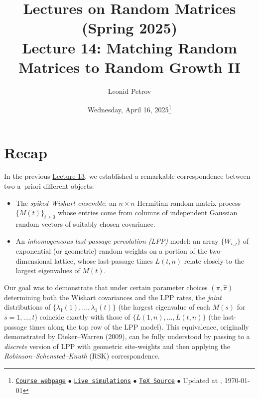 \documentclass[letterpaper,11pt,oneside,reqno]{article}
\numberwithin{equation}{section}
\theoremstyle{definition}
\begin{document}
\title{Lectures on Random Matrices
(Spring 2025)
\\Lecture 14: Matching Random Matrices to Random Growth II}


\date{Wednesday, April 16, 2025\footnote{\href{https://lpetrov.cc/rmt25/}{\texttt{Course webpage}}
$\bullet$ \href{https://lpetrov.cc/simulations/model/random-matrices/}{\texttt{Live simulations}}
$\bullet$ \href{https://lpetrov.cc/rmt25/rmt25-notes/rmt2025-l14.tex}{\texttt{TeX Source}}
$\bullet$
Updated at \currenttime, \today}}



\author{Leonid Petrov}


\maketitle
\tableofcontents



\section{Recap}

In the previous
\href{https://lpetrov.cc/rmt25/rmt25-notes/rmt2025-l13.pdf}{Lecture 13}, we established a remarkable correspondence between two a~priori different objects:

\begin{itemize}
\item The \emph{spiked Wishart ensemble}: an $n\times n$ Hermitian random-matrix process $\{M(t)\}_{t\ge0}$ whose entries come from columns of independent Gaussian random vectors of suitably chosen covariance.
\item An \emph{inhomogeneous last-passage percolation (LPP)} model: an array $\{W_{i,j}\}$ of exponential (or geometric) random weights on a portion of the two-dimensional lattice, whose last-passage times $L(t,n)$ relate closely to the largest eigenvalues of $M(t)$.
\end{itemize}

Our goal was to demonstrate that under certain parameter choices $(\pi,\hat\pi)$ determining both the Wishart covariances and the LPP rates, the \emph{joint} distributions of $\{\lambda_1(1),\dots,\lambda_1(t)\}$ (the largest eigenvalue of each $M(s)$ for $s=1,\dots,t$) coincide exactly with those of $\{L(1,n),\dots,L(t,n)\}$ (the last-passage times along the top row of the LPP model). This equivalence, originally demonstrated by Dieker--Warren (2009), can be fully understood by passing to a \emph{discrete} version of LPP with geometric site-weights and then applying the \emph{Robinson--Schensted--Knuth} (RSK) correspondence.
\end{document}
